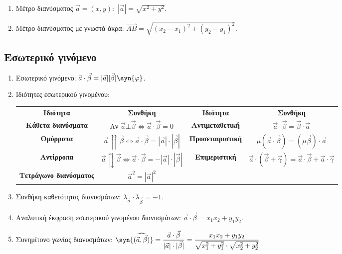 \documentclass[11pt,a4paper]{article}
\begin{document}
\begin{enumerate}
\item Μέτρο διανύσματος $ \vec{a}=(x,y) $:\ $ |\vec{a}|=\sqrt{x^2+y^2} $.
\item Μέτρο διανύσματος με γνωστά άκρα: $ \overrightarrow{AB}=\sqrt{(x_2-x_1)^2+(y_2-y_1)^2} $.
\end{enumerate}
\subsection{Εσωτερικό γινόμενο}
\begin{enumerate}
\item Εσωτερικό γινόμενο: $ \vec{a}\cdot\vec{\beta}=|\vec{a}||\vec{\beta}|\syn{\varphi} $.
\item Ιδιότητες εσωτερικού γινομένου:
\begin{center}
\begin{longtable}{cc|cc}
\hline \rule[-2ex]{0pt}{5.5ex} \textbf{Ιδιότητα} & \textbf{Συνθήκη} & \textbf{Ιδιότητα} & \textbf{Συνθήκη} \\ 
\hhline{====}  \rule[-2ex]{0pt}{5.5ex} \textbf{Κάθετα διανύσματα} & Αν $ \vec{a}\bot\vec{\beta}\Leftrightarrow \vec{a}\cdot\vec{\beta}=0 $ & \textbf{Αντιμεταθετική} & $ \vec{a}\cdot\vec{\beta}=\vec{\beta}\cdot\vec{a} $ \\ 
 \rule[-2ex]{0pt}{5.5ex} \textbf{Ομόρροπα } & $ \vec{a}\upuparrows\vec{\beta}\Leftrightarrow \vec{a}\cdot\vec{\beta}=|\vec{a}|\cdot|\vec{\beta}| $ & \textbf{Προσεταιριστική} & $ \mu(\vec{a}\cdot\vec{\beta})=(\mu\vec{\beta})\cdot\vec{a} $ \\ 
 \rule[-2ex]{0pt}{5.5ex} \textbf{Αντίρροπα} & $ \vec{a}\updownarrows\vec{\beta}\Leftrightarrow \vec{a}\cdot\vec{\beta}=-|\vec{a}|\cdot|\vec{\beta}| $ & \textbf{Επιμεριστική} & $ \vec{a}\cdot\left( \vec{\beta}+\vec{\gamma}\right) =\vec{a}\cdot\vec{\beta}+\vec{a}\cdot\vec{\gamma} $ \\ 
 \rule[-2ex]{0pt}{5.5ex} \textbf{Τετράγωνο διανύσματος} & $ \vec{a}^2=|\vec{a}|^2 $ & & \\ 
\hline 
\end{longtable} 
\end{center}
\vspace{-7mm}
\item Συνθήκη καθετότητας διανυσμάτων: $ \lambda_{\vec{a}}\cdot\lambda_{\vec{\beta}}=-1 $.
\item Αναλυτική έκφραση εσωτερικού γινομένου διανυσμάτων: $ \vec{a}\cdot\vec{\beta}=x_1x_2+y_1y_2 $.
\item Συνημίτονο γωνίας διανυσμάτων: $ \syn{(\widehat{\vec{a},\vec{\beta}})}=\dfrac{\vec{a}\cdot\vec{\beta}}{|\vec{a}|\cdot|\vec{\beta}|}=\dfrac{x_1x_2+y_1y_2}{\sqrt{x_1^2+y_1^2}\cdot\sqrt{x_2^2+y_2^2}} $
\end{enumerate}
\newpage
\end{document}

